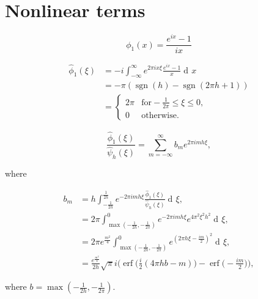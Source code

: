 \documentclass[14pt]{article}
\DeclareMathOperator{\diff}{d\!}
\DeclareMathOperator{\sgn}{sgn}
\DeclareMathOperator{\erf}{erf}
\begin{document}
\section{Nonlinear terms}

\begin{equation}
  \phi_1(x) = \frac{e^{i x}-1}{i x}
\end{equation}

\begin{align}
  \hat{\phi}_1(\xi) &=-i\int_{-\infty}^{\infty} e^{2\pi i x\xi}\frac{e^{i x}-1}{x}\diff x\\
  &= -\pi(\sgn(h) - \sgn(2\pi h + 1)) \\
  &= \begin{cases}
    2\pi & \mathrm{for} -\frac{1}{2\pi} \leq \xi \leq 0, \\
    0 & \mathrm{otherwise}.
    \end{cases}
\end{align}

\begin{equation}
  \frac{\hat{\phi}_1(\xi)}{\hat{\psi}_h(\xi)} = \sum_{m=-\infty}^{\infty}b_me^{2\pi i m h\xi},
\end{equation}

\noindent where

\begin{align}
  b_m &= h\int_{-\frac{1}{2h}}^{\frac{1}{2h}} e^{-2\pi i m h \xi}\frac{\hat{\phi}_1(\xi)}{\hat{\psi}_h(\xi)} \diff\xi, \\
  &= 2\pi\int_{\max(-\frac{1}{2h}, -\frac{1}{2\pi})}^{0} e^{-2\pi i m h \xi}e^{4\pi^2\xi^2h^2} \diff\xi, \\
  &= 2\pi e^{\frac{m^2}{4}}\int_{\max(-\frac{1}{2h}, -\frac{1}{2\pi})}^{0} e^{(2\pi h \xi - \frac{i m}{2})^2} \diff\xi, \\
  &= \frac{e^\frac{m^2}{4}}{2h}\sqrt{\pi}i\Bigg(\erf\Big(\frac{i}{2}(4\pi h b - m)\Big) - \erf\Big(-\frac{i m}{2}\Big)\Bigg),
\end{align}

\noindent where $b=\max(-\frac{1}{2h}, -\frac{1}{2\pi})$.
\end{document}
